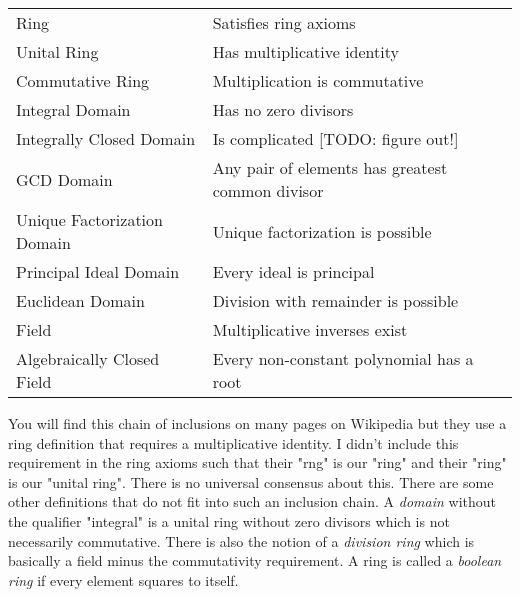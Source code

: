 \medskip
\begin{tabular}{l l}
Ring                        & Satisfies ring axioms \\
Unital Ring                 & Has multiplicative identity \\
Commutative Ring            & Multiplication is commutative \\
Integral Domain             & Has no zero divisors \\
Integrally Closed Domain    & Is complicated [TODO: figure out!] \\
GCD Domain                  & Any pair of elements has greatest common divisor \\
Unique Factorization Domain & Unique factorization is possible \\
Principal Ideal Domain      & Every ideal is principal \\
Euclidean Domain            & Division with remainder is possible \\
Field                       & Multiplicative inverses exist \\
Algebraically Closed Field  & Every non-constant polynomial has a root
\end{tabular}
\medskip

You will find this chain of inclusions on many pages on Wikipedia but they use a ring definition that requires a multiplicative identity. I didn't include this requirement in the ring axioms such that their "rng" is our "ring" and their "ring" is our "unital ring". There is no universal consensus about this. There are some other definitions that do not fit into such an inclusion chain. A \emph{domain} without the qualifier "integral" is a unital ring without zero divisors which is not necessarily commutative. There is also the notion of a \emph{division ring} which is basically a field minus the commutativity requirement. A ring is called a \emph{boolean ring} if every element squares to itself. 

%
%



